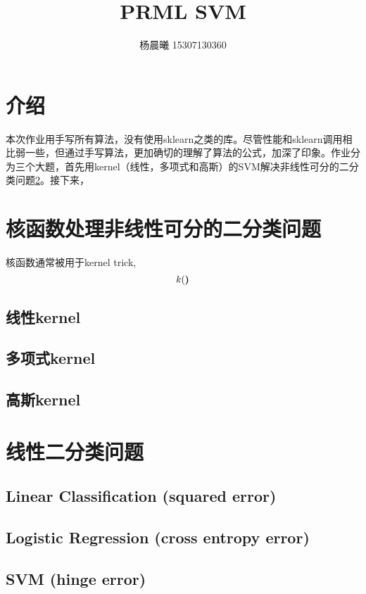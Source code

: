 \documentclass[UTF8]{article}
\begin{document}
\begin{titlepage}
\title{\bfseries PRML SVM}
\author{杨晨曦 15307130360}
\maketitle
\tableofcontents
\thispagestyle{empty}
\end{titlepage}


\section{介绍}
本次作业用手写所有算法，没有使用sklearn之类的库。尽管性能和sklearn调用相比弱一些，但通过手写算法，更加确切的理解了算法的公式，加深了印象。作业分为三个大题，首先用kernel（线性，多项式和高斯）的SVM解决非线性可分的二分类问题\ref{kernel}。接下来，

\section{核函数处理非线性可分的二分类问题}\label{kernel}
核函数通常被用于kernel trick, $$k(\textbf)$$
\subsection{线性kernel}
\subsection{多项式kernel}
\subsection{高斯kernel}

\section{线性二分类问题}

\subsection{Linear Classification (squared error)}
\subsection{Logistic Regression (cross entropy error)}
\subsection{SVM (hinge error)}
\end{document}
